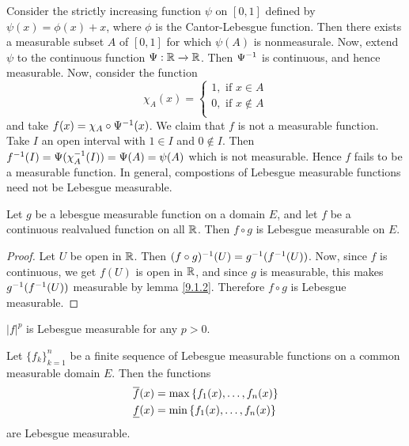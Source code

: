 \begin{example}\label{example_9.1}
    Consider the strictly increasing function $\psi$ on  $[0,1]$ defined by
    $\psi(x)=\phi(x)+x$, where $\phi$ is the Cantor-Lebesgue function. Then
    there exists a measurable subset $A$ of $[0,1]$ for which $\psi(A)$ is
    nonmeasurale. Now, extend $\psi$ to the continuous function  $\Psi:\mathbb{R}
    \xrightarrow{} \mathbb{R}$. Then $\Psi^{-1}$ is continuous, and hence measurable.
    Now, consider the function
    \begin{equation*}
        \chi_A(x)=  \begin{cases}
                     1, \text{ if } x \in A \\
                     0, \text{ if } x \notin A \\
                 \end{cases}
    \end{equation*}
    and take $f(x)=\chi_A \circ \Psi^{-1}(x)$. We claim that $f$ is not a
    measurable function. Take  $I$ an open interval with  $1 \in I$ and  $0
    \notin I$. Then $f^{-1}(I)=\Psi(\chi_A^{-1}(I))=\Psi(A)=\psi(A)$ which is
    not measurable. Hence $f$ fails to be a measurable function. In general,
    compostions of Lebesgue measurable functions need not be Lebesgue measurable.
\end{example}

\begin{theorem}\label{9.1.6}
    Let $g$ be a lebesgue measurable function on a domain  $E$, and let  $f$ be a
    continuous realvalued function on all  $\mathbb{R}$. Then  $f \circ g$ is Lebesgue
    measurable on  $E$.
\end{theorem}
\begin{proof}
    Let $U$ be open in  $\mathbb{R}$. Then  $(f \circ g)^{-1}(U)=g^{-1}(f^{-1}(U))$.
    Now, since $f$ is continuous, we get  $f(U)$ is open in $\mathbb{R}$, and since  $g$
    is measurable, this makes  $g^{-1}(f^{-1}(U))$ measurable by lemma
    \ref{9.1.2}. Therefore $f \circ g$ is Lebesgue measurable.
\end{proof}
\begin{corollary}
    $|f|^p$ is Lebesgue measurable for any  $p>0$.
\end{corollary}

\begin{lemma}\label{9.1.7}
    Let $\{f_k\}_{k=1}^n$ be a finite sequence of Lebesgue measurable functions
    on a common measurable domain $E$. Then the functions
    \begin{align*}
        \overline{f}(x)  &=  \max{\{f_1(x), \dots, f_n(x)\}} \\
        \underline{f}(x)  &=  \min{\{f_1(x), \dots, f_n(x)\}} \\
    \end{align*}
    are Lebesgue measurable.
\end{lemma}
